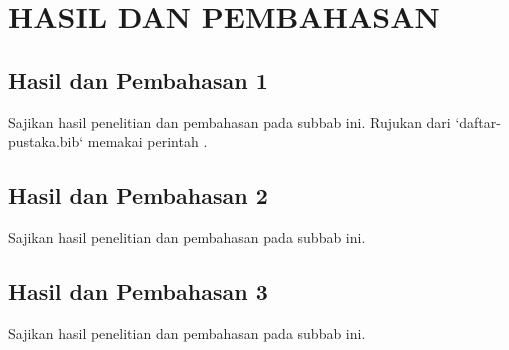 %
\chapter{HASIL DAN PEMBAHASAN}


\section{Hasil dan Pembahasan 1}

Sajikan hasil penelitian dan pembahasan pada subbab ini. Rujukan dari
`daftar-pustaka.bib` memakai perintah \cite{buku2020}.


\section{Hasil dan Pembahasan 2}

Sajikan hasil penelitian dan pembahasan pada subbab ini.


\section{Hasil dan Pembahasan 3}

Sajikan hasil penelitian dan pembahasan pada subbab ini.



